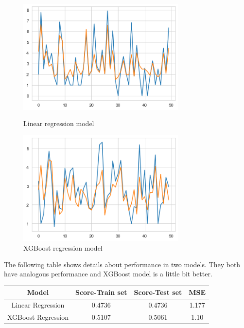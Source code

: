 \documentclass[11pt]{article}
\begin{document}
\begin{figure}[h]
\centering
\begin{minipage}[t]{0.48\textwidth}
\centering
    \includegraphics[width=0.75\textwidth]{plots/lr.png}
    \caption{Linear regression model}
\end{minipage}
\begin{minipage}[t]{0.48\textwidth}
\centering
    \includegraphics[width=0.75\textwidth]{plots/xgboost.png}
    \caption{XGBoost regression model}
\end{minipage}
\end{figure}

The following table shows details about performance in two models. They both have analogous performance and XGBoost model is a little bit better.

\begin{center}
\begin{tabular}{||c c c c||} 
 \hline
 Model & Score-Train set & Score-Test set & MSE \\ [0.5ex] 
 \hline\hline
 Linear Regression & 0.4736 & 0.4736 & 1.177 \\ 
 \hline
 XGBoost Regression & 0.5107 & 0.5061 & 1.10 \\
 \hline
\end{tabular}
\end{center}
\end{document}
